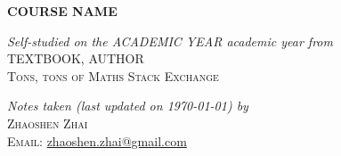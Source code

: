 \pagestyle{empty}
\begin{center}
    \Large\textbf{\textsc{COURSE NAME}}
\end{center}
\vspace*{0.03\textheight}
\begin{minipage}[t]{0.5\textwidth}
    \centering
    {\large\textit{Self-studied on the ACADEMIC YEAR academic year from}}
    \\[\baselineskip]
    {\textsc{TEXTBOOK}, AUTHOR}
    \\[0.3\baselineskip]
    {\textsc{Tons, tons of Maths Stack Exchange}}
\end{minipage}
\begin{minipage}[t]{0.5\textwidth}
    \centering
    {\large\textit{Notes taken (last updated on \today) by}}
    \\[\baselineskip]
    {\textsc{Zhaoshen Zhai}}
    \\[0.3\baselineskip]
    {\textsc{Email: }\url{zhaoshen.zhai@gmail.com}}
\end{minipage}
\\[2\baselineskip]
\begin{center}
    \textsc{\bfseries\contentsname}
\end{center}

\toccontents
\clearpage
\pagestyle{fancyplain}
\fancyhead[L,C,R]{}
\fancyfoot[L,R]{}
\fancyfoot[C]{\thepage}
\renewcommand{\headrulewidth}{0pt}
\setcounter{page}{1}
